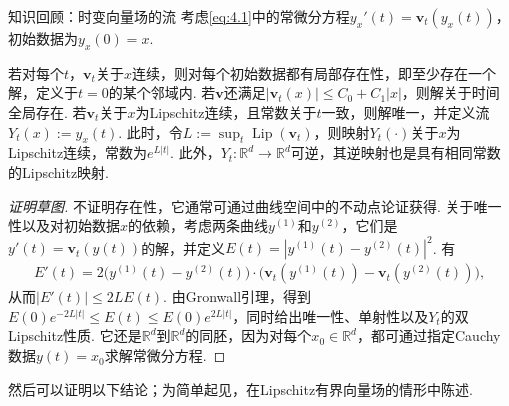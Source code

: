 \begin{sourcebox}{知识回顾：时变向量场的流}\label{box:4.1}
考虑\eqref{eq:4.1}中的常微分方程$y_x'(t)=\mathbf v_t(y_x(t))$，初始数据为$y_x(0)=x$.
\begin{proposition*}
若对每个$t$，$\mathbf v_t$关于$x$连续，则对每个初始数据都有局部存在性，即至少存在一个解，定义于$t=0$的某个邻域内. 若$\mathbf v$还满足$|\mathbf v_t(x)|\leq C_0+C_1|x|$，则解关于时间全局存在. 若$\mathbf v_t$关于$x$为Lipschitz连续，且常数关于$t$一致，则解唯一，并定义流$Y_t(x):=y_x(t)$. 此时，令$L:=\sup_t\operatorname{Lip}(\mathbf v_t)$，则映射$Y_t(\cdot)$关于$x$为Lipschitz连续，常数为$e^{L|t|}$. 此外，$Y_t:\mathbb R^d\to\mathbb R^d$可逆，其逆映射也是具有相同常数的Lipschitz映射.
\end{proposition*}
\begin{proof}[证明草图]
不证明存在性，它通常可通过曲线空间中的不动点论证获得. 关于唯一性以及对初始数据$x$的依赖，考虑两条曲线$y^{(1)}$和$y^{(2)}$，它们是$y'(t)=\mathbf v_t(y(t))$的解，并定义$E(t)=|y^{(1)}(t)-y^{(2)}(t)|^2$. 有
\begin{equation*}
\begin{aligned}
 E'(t)=2\bigl(y^{(1)}(t)-y^{(2)}(t)\bigr)\cdot
 \bigl(\mathbf v_t(y^{(1)}(t))-\mathbf v_t(y^{(2)}(t))\bigr),
\end{aligned}
\end{equation*}
从而$|E'(t)|\leq2LE(t)$. 由Gronwall引理，得到$E(0)e^{-2L|t|}\leq E(t)\leq E(0)e^{2L|t|}$，同时给出唯一性、单射性以及$Y_t$的双Lipschitz性质. 它还是$\mathbb R^d$到$\mathbb R^d$的同胚，因为对每个$x_0\in\mathbb R^d$，都可通过指定Cauchy数据$y(t)=x_0$求解常微分方程.
\end{proof}
\end{sourcebox}

然后可以证明以下结论；为简单起见，在Lipschitz有界向量场的情形中陈述.

